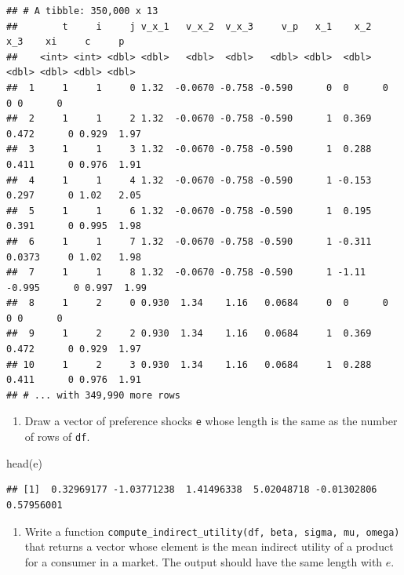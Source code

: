 \documentclass[
]{book}
\newenvironment{Shaded}{\begin{snugshade}}{\end{snugshade}}
\newcommand{\FunctionTok}[1]{\textcolor[rgb]{0.00,0.00,0.00}{#1}}
\newcommand{\NormalTok}[1]{#1}
\providecommand{\tightlist}{%
  \setlength{\itemsep}{0pt}\setlength{\parskip}{0pt}}
\begin{document}
\begin{verbatim}
## # A tibble: 350,000 x 13
##        t     i     j v_x_1   v_x_2  v_x_3     v_p   x_1    x_2     x_3    xi     c     p
##    <int> <int> <dbl> <dbl>   <dbl>  <dbl>   <dbl> <dbl>  <dbl>   <dbl> <dbl> <dbl> <dbl>
##  1     1     1     0 1.32  -0.0670 -0.758 -0.590      0  0      0          0 0      0   
##  2     1     1     2 1.32  -0.0670 -0.758 -0.590      1  0.369  0.472      0 0.929  1.97
##  3     1     1     3 1.32  -0.0670 -0.758 -0.590      1  0.288  0.411      0 0.976  1.91
##  4     1     1     4 1.32  -0.0670 -0.758 -0.590      1 -0.153  0.297      0 1.02   2.05
##  5     1     1     6 1.32  -0.0670 -0.758 -0.590      1  0.195  0.391      0 0.995  1.98
##  6     1     1     7 1.32  -0.0670 -0.758 -0.590      1 -0.311  0.0373     0 1.02   1.98
##  7     1     1     8 1.32  -0.0670 -0.758 -0.590      1 -1.11  -0.995      0 0.997  1.99
##  8     1     2     0 0.930  1.34    1.16   0.0684     0  0      0          0 0      0   
##  9     1     2     2 0.930  1.34    1.16   0.0684     1  0.369  0.472      0 0.929  1.97
## 10     1     2     3 0.930  1.34    1.16   0.0684     1  0.288  0.411      0 0.976  1.91
## # ... with 349,990 more rows
\end{verbatim}

\begin{enumerate}
\def\labelenumi{\arabic{enumi}.}
\setcounter{enumi}{5}
\tightlist
\item
  Draw a vector of preference shocks \texttt{e} whose length is the same as the number of rows of \texttt{df}.
\end{enumerate}

\begin{Shaded}
\begin{Highlighting}[]
\FunctionTok{head}\NormalTok{(e)}
\end{Highlighting}
\end{Shaded}

\begin{verbatim}
## [1]  0.32969177 -1.03771238  1.41496338  5.02048718 -0.01302806  0.57956001
\end{verbatim}

\begin{enumerate}
\def\labelenumi{\arabic{enumi}.}
\setcounter{enumi}{6}
\tightlist
\item
  Write a function \texttt{compute\_indirect\_utility(df,\ beta,\ sigma,\ mu,\ omega)} that returns a vector whose element is the mean indirect utility of a product for a consumer in a market. The output should have the same length with \(e\).
\end{enumerate}
\end{document}
